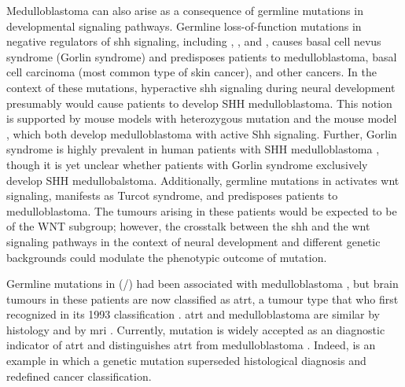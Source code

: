 Medulloblastoma can also arise as a consequence of germline mutations in developmental signaling pathways. Germline loss-of-function mutations in negative regulators of \gls{shh} signaling, including , , and , causes basal cell nevus syndrome (Gorlin syndrome) and predisposes patients to medulloblastoma, basal cell carcinoma (most common type of skin cancer), and other cancers. In the context of these mutations, hyperactive \gls{shh} signaling during neural development presumably would cause patients to develop SHH medulloblastoma. This notion is supported by mouse models with heterozygous  mutation  and the \high{+/-} \high{-/-} mouse model , which both develop medulloblastoma with active Shh signaling. Further, Gorlin syndrome is highly prevalent in human patients with SHH medulloblastoma , though it is yet unclear whether patients with Gorlin syndrome exclusively develop SHH medullobalstoma. Additionally, germline mutations in  activates \gls{wnt} signaling, manifests as Turcot syndrome, and predisposes patients to medulloblastoma. The tumours arising in these patients would be expected to be of the WNT subgroup; however, the crosstalk between the \gls{shh} and the \gls{wnt} signaling pathways in the context of neural development and different genetic backgrounds could modulate the phenotypic outcome of  mutation.

Germline mutations in  (/) had been associated with medulloblastoma , but brain tumours in these patients are now classified as \gls{atrt}, a tumour type that \gls{who} first recognized in its 1993 classification . \gls{atrt} and medulloblastoma are similar by histology and by \gls{mri} . Currently,  mutation is widely accepted as an diagnostic indicator of \gls{atrt} and distinguishes \gls{atrt} from medulloblastoma . Indeed,  is an example in which a genetic mutation superseded histological diagnosis and redefined cancer classification.

